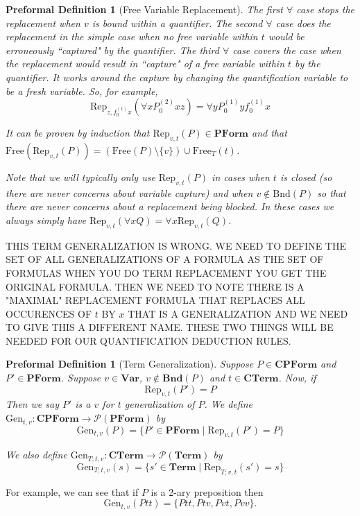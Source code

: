 \documentclass[oneside, 12pt]{book}
\theoremstyle{break}
\newtheorem{preformal definition}[definition]{Preformal Definition}
\newtheorem{preformal theorem}[theorem]{Preformal Theorem}
\newcommand{\mc}[1]{\mathcal{#1}}
\newcommand{\qq}[1]{``#1"}
\begin{document}
\begin{preformal definition}[Free Variable Replacement]
			The first $\forall$ case stops the replacement when $v$ is bound within a quantifier.
			The second $\forall$ case does the replacement in the simple case when no free variable within $t$ would be erroneously \qq{captured} by the quantifier.
			The third $\forall$ case covers the case when the replacement would result in \qq{capture} of a free variable within $t$ by the quantifier.
			It works around the capture by changing the quantification variable to be a fresh variable.
			So, for example,
			\begin{equation*}
				\text{Rep}_{z, f_0^{(1)}x}(\forall x P_0^{(2)}xz) = \forall y P_0^{(1)}yf_0^{(1)}x 
			\end{equation*}			
			
			It can be proven by induction that $\text{Rep}_{v, t}(P) \in \textbf{PForm}$ and that $\text{Free}(\text{Rep}_{v, t}(P)) = (\text{Free}(P) \setminus \{v\}) \cup \text{Free}_T(t)$.
			
			Note that we will typically only use $\text{Rep}_{v, t}(P)$ in cases when $t$ is closed (so there are never concerns about variable capture) and when $v\not \in \text{Bnd}(P)$ so that there are never concerns about a replacement being blocked.
			In these cases we always simply have $\text{Rep}_{v, t}(\forall x Q) = \forall x \text{Rep}_{v, t}(Q)$.
		\end{preformal definition}	
	
		THIS TERM GENERALIZATION IS WRONG. WE NEED TO DEFINE THE SET OF ALL GENERALIZATIONS OF A FORMULA AS THE SET OF FORMULAS WHEN YOU DO TERM REPLACEMENT YOU GET THE ORIGINAL FORMULA. THEN WE NEED TO NOTE THERE IS A "MAXIMAL" REPLACEMENT FORMULA THAT REPLACES ALL OCCURENCES OF $t$ BY $x$ THAT IS A GENERALIZATION AND WE NEED TO GIVE THIS A DIFFERENT NAME. THESE TWO THINGS WILL BE NEEDED FOR OUR QUANTIFICATION DEDUCTION RULES.
		\begin{preformal definition}[Term Generalization]
			Suppose $P \in \textbf{CPForm}$ and $P' \in \textbf{PForm}$. 
			Suppose $v\in \textbf{Var}$, $v\not \in \textbf{Bnd}(P)$ and $t\in \textbf{CTerm}$.
			Now, if 
			\begin{equation*}
				\text{Rep}_{v, t}(P') = P
			\end{equation*}
			Then we say $P'$ is a $v$ for $t$ generalization of $P$.
			We define $\text{Gen}_{t, v}: \textbf{CPForm} \to \mc{P}(\textbf{PForm})$ by 
			\begin{equation*}
				\text{Gen}_{t, v}(P) = \{P' \in \textbf{PForm} \mid \text{Rep}_{v, t}(P') = P\}
			\end{equation*}
			
			We also define $\text{Gen}_{T;t, v}: \textbf{CTerm} \to \mc{P}(\textbf{Term})$ by
			\begin{equation*}
				\text{Gen}_{T; t, v}(s) = \{s'\in \textbf{Term} \mid \text{Rep}_{T; v, t}(s') = s\}
			\end{equation*}
		\end{preformal definition}
		For example, we can see that if $P$ is a 2-ary preposition then 
		\begin{equation*}
			\text{Gen}_{t, v}(Ptt) = \{Ptt, Ptv, Pvt, Pvv\}.
		\end{equation*}
		
\end{document}
